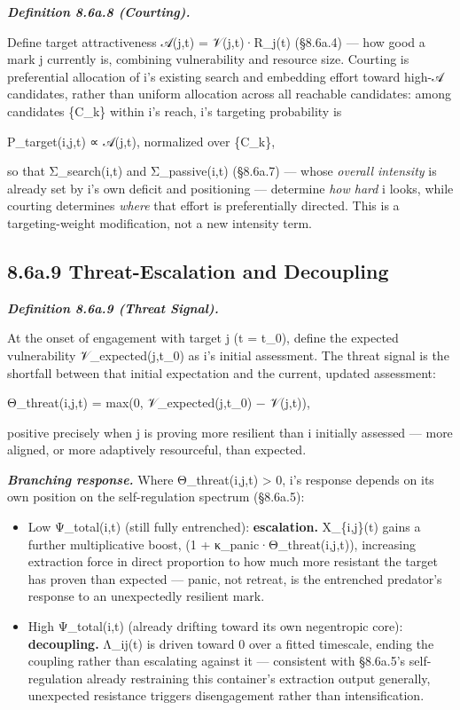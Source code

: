 \documentclass[
]{article}
\begin{document}
\emph{\textbf{Definition 8.6a.8 (Courting).}}

Define target attractiveness 𝒜(j,t) = 𝒱(j,t)·R\_j(t) (§8.6a.4) --- how
good a mark j currently is, combining vulnerability and resource size.
Courting is preferential allocation of i's existing search and embedding
effort toward high-𝒜 candidates, rather than uniform allocation across
all reachable candidates: among candidates \{C\_k\} within i's reach,
i's targeting probability is

P\_target(i,j,t) ∝ 𝒜(j,t), normalized over \{C\_k\},

so that Σ\_search(i,t) and Σ\_passive(i,t) (§8.6a.7) --- whose
\emph{overall intensity} is already set by i's own deficit and
positioning --- determine \emph{how hard} i looks, while courting
determines \emph{where} that effort is preferentially directed. This is
a targeting-weight modification, not a new intensity term.

\hypertarget{a.9-threat-escalation-and-decoupling}{%
\subsection{8.6a.9 Threat-Escalation and
Decoupling}\label{a.9-threat-escalation-and-decoupling}}

\emph{\textbf{Definition 8.6a.9 (Threat Signal).}}

At the onset of engagement with target j (t = t\_0), define the expected
vulnerability 𝒱\_expected(j,t\_0) as i's initial assessment. The threat
signal is the shortfall between that initial expectation and the
current, updated assessment:

Θ\_threat(i,j,t) = max(0, 𝒱\_expected(j,t\_0) − 𝒱(j,t)),

positive precisely when j is proving more resilient than i initially
assessed --- more aligned, or more adaptively resourceful, than
expected.

\emph{\textbf{Branching response.}} Where Θ\_threat(i,j,t)
\textgreater{} 0, i's response depends on its own position on the
self-regulation spectrum (§8.6a.5):

\begin{itemize}
\item
  Low Ψ\_total(i,t) (still fully entrenched): \textbf{escalation.}
  X\_\{i,j\}(t) gains a further multiplicative boost, (1 +
  κ\_panic·Θ\_threat(i,j,t)), increasing extraction force in direct
  proportion to how much more resistant the target has proven than
  expected --- panic, not retreat, is the entrenched predator's response
  to an unexpectedly resilient mark.
\item
  High Ψ\_total(i,t) (already drifting toward its own negentropic core):
  \textbf{decoupling.} Λ\_ij(t) is driven toward 0 over a fitted
  timescale, ending the coupling rather than escalating against it ---
  consistent with §8.6a.5's self-regulation already restraining this
  container's extraction output generally, unexpected resistance
  triggers disengagement rather than intensification.
\end{itemize}
\end{document}
